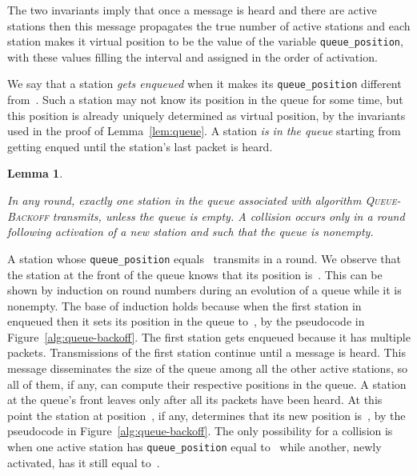 \documentclass[11pt]{article}
\newcommand{\qed}{\hfill  \smallbreak}
\newenvironment{proof}{\noindent{\bf Proof:}}{\qed}
\newtheorem{lemma}{Lemma}
\begin{document}
\begin{proof}
The two invariants imply that once a message is heard and there are  active stations then this message propagates the true number of active stations and each station makes it virtual position to be the value of the variable \texttt{queue\_position}, with these values filling the interval  and assigned in the order of activation. 
\end{proof} 

We say that a station \emph{gets enqueued} when it makes its \texttt{queue\_position} different from~.
Such a station may not know its position in the queue for some time, but this position is already uniquely determined as virtual position, by the invariants used in the proof of Lemma~\ref{lem:queue}.
A station \emph{is in the queue} starting from getting enqued until the station's last packet is heard.



\begin{lemma}
\label{lem:queue-transmits}

In any round, exactly one station in the queue associated with algorithm \textsc{Queue-Backoff} transmits, unless the queue is empty.
A collision occurs only in a round following activation of a new station and such that the queue is nonempty.
\end{lemma}

\begin{proof}
A station whose \texttt{queue\_position} equals~ transmits in a round.
We observe that the station at the front of the queue knows that its position is~.
This can be shown by induction on round numbers during an evolution of a queue while it is nonempty.
The base of induction holds because when the first station in enqueued then it sets its position in the queue to~, by the pseudocode in Figure~\ref{alg:queue-backoff}.
The first station gets enqueued because it has multiple packets.
Transmissions of the first station continue until a message is heard.
This message disseminates the size of the queue among all the other active stations, so all of them, if any, can compute their respective positions in the queue.
A station at the queue's front leaves only after all its packets have been heard.
At this point the station at position~, if any, determines that its new position is~, by the pseudocode in Figure~\ref{alg:queue-backoff}.
The only possibility for a collision is when one active station has \texttt{queue\_position} equal to~ while another, newly activated, has it still equal to~.
\end{proof}
\end{document}
